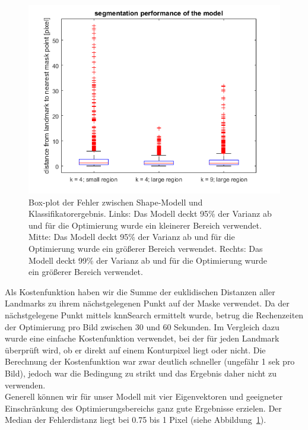 \documentclass[]{report}
\begin{document}
\begin{enumerate}
\begin{enumerate}
\begin{figure}
					\includegraphics{figures/box_4S_4L_9L.png}
					\caption{Box-plot der Fehler zwischen Shape-Modell und Klassifikatorergebnis. Links: Das Modell deckt 95\% der Varianz ab und für die Optimierung wurde ein kleinerer Bereich verwendet. Mitte: Das Modell deckt 95\% der Varianz ab und für die Optimierung wurde ein größerer Bereich verwendet. Rechts: Das Modell deckt 99\% der Varianz ab und für die Optimierung wurde ein größerer Bereich verwendet.}
					\label{fig:box4S4L9L}
				\end{figure}
				Als Kostenfunktion haben wir die Summe der euklidischen Distanzen aller Landmarks zu ihrem nächstgelegenen Punkt auf der Maske verwendet. Da der nächstgelegene Punkt mittels knnSearch ermittelt wurde, betrug die Rechenzeiten der Optimierung pro Bild zwischen 30 und 60 Sekunden. Im Vergleich dazu wurde eine einfache Kostenfunktion verwendet, bei der für jeden Landmark überprüft wird, ob er direkt auf einem Konturpixel liegt oder nicht. Die Berechnung der Kostenfunktion war zwar deutlich schneller (ungefähr 1 sek pro Bild), jedoch war die Bedingung zu strikt und das Ergebnis daher nicht zu verwenden.\\
				
				Generell können wir für unser Modell mit vier Eigenvektoren und geeigneter Einschränkung des Optimierungsbereichs ganz gute Ergebnisse erzielen. Der Median der Fehlerdistanz liegt bei 0.75 bis 1 Pixel (siehe Abbildung~\ref{fig:box4S4L9L}). %
				
			\end{enumerate}
			
	\end{enumerate}
	
\end{document}
